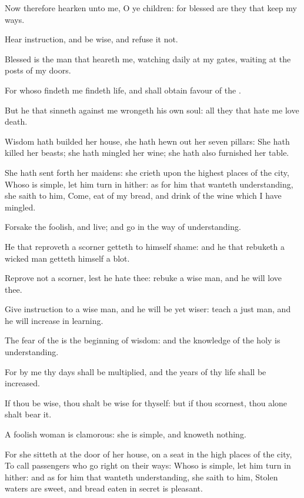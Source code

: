 \Verse Now therefore hearken unto me, O ye children: for blessed are they that keep my ways.

\Verse Hear instruction, and be wise, and refuse it not.

\Verse Blessed is the man that heareth me, watching daily at my gates, waiting at the posts of my doors.

\Verse For whoso findeth me findeth life, and shall obtain favour of the \LORD.

\Verse But he that sinneth against me wrongeth his own soul: all they that hate me love death.


\Chapter
\Verse Wisdom hath builded her house, she hath hewn out her seven pillars: \Verse She hath killed her beasts; she hath mingled her wine; she hath also furnished her table.

\Verse She hath sent forth her maidens: she crieth upon the highest places of the city, \Verse Whoso is simple, let him turn in hither: as for him that wanteth understanding, she saith to him, \Verse Come, eat of my bread, and drink of the wine which I have mingled.

\Verse Forsake the foolish, and live; and go in the way of understanding.

\Verse He that reproveth a scorner getteth to himself shame: and he that rebuketh a wicked man getteth himself a blot.

\Verse Reprove not a scorner, lest he hate thee: rebuke a wise man, and he will love thee.

\Verse Give instruction to a wise man, and he will be yet wiser: teach a just man, and he will increase in learning.

\Verse The fear of the \LORD is the beginning of wisdom: and the knowledge of the holy is understanding.

\Verse For by me thy days shall be multiplied, and the years of thy life shall be increased.

\Verse If thou be wise, thou shalt be wise for thyself: but if thou scornest, thou alone shalt bear it.

\Verse A foolish woman is clamorous: she is simple, and knoweth nothing.

\Verse For she sitteth at the door of her house, on a seat in the high places of the city, \Verse To call passengers who go right on their ways: \Verse Whoso is simple, let him turn in hither: and as for him that wanteth understanding, she saith to him, \Verse Stolen waters are sweet, and bread eaten in secret is pleasant.

